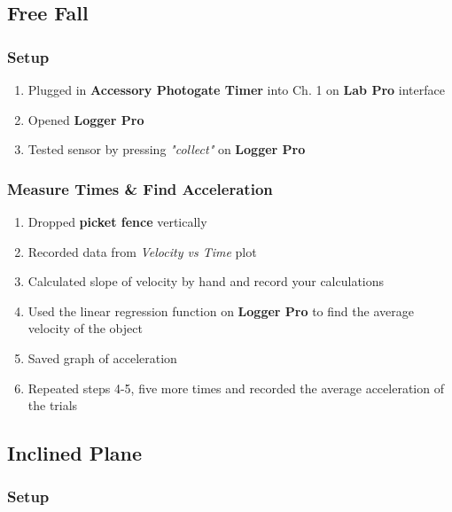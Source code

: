\documentclass[a4paper,12pt]{article}
\begin{document}
\subsection{Free Fall}

\subsubsection{Setup}

	\begin{enumerate}

		\item Plugged in \textbf{Accessory Photogate Timer} into Ch. 1 on \textbf{Lab Pro} interface
		\item Opened \textbf{Logger Pro}
			
		\item Tested sensor by pressing \textit{"collect"} on \textbf{Logger Pro}
	\end{enumerate}	

\subsubsection{Measure Times \& Find Acceleration}
	\begin{enumerate}[resume]

		\item Dropped \textbf{picket fence} vertically
	
		\item Recorded data from \textit{Velocity vs Time} plot

		\item Calculated slope of velocity by hand and record your calculations

		\item Used the linear regression function on \textbf{Logger Pro} to find the average velocity of the object

		\item Saved graph of acceleration

		\item Repeated steps 4-5, five more times and recorded the average acceleration of the trials
	\end{enumerate}

\subsection{Inclined Plane}

\subsubsection{Setup}
\end{document}
